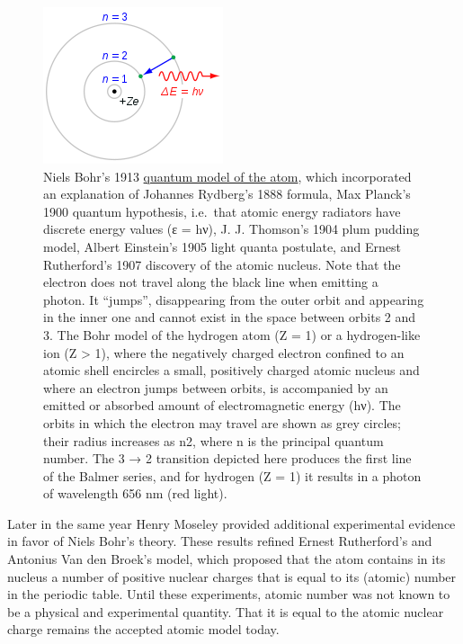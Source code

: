 \begin{figure}

{\centering \includegraphics[width=0.7\linewidth]{./figures/chemistry/Bohr_atom_model} 

}

\caption{Niels Bohr's 1913 \href{https://en.wikipedia.org/wiki/Bohr_model\#/media/File:Bohr_atom_model.svg}{quantum model of the atom}, which incorporated an explanation of Johannes Rydberg's 1888 formula, Max Planck's 1900 quantum hypothesis, i.e.~that atomic energy radiators have discrete energy values (ε = hν), J. J. Thomson's 1904 plum pudding model, Albert Einstein's 1905 light quanta postulate, and Ernest Rutherford's 1907 discovery of the atomic nucleus. Note that the electron does not travel along the black line when emitting a photon. It ``jumps'', disappearing from the outer orbit and appearing in the inner one and cannot exist in the space between orbits 2 and 3. The Bohr model of the hydrogen atom (Z = 1) or a hydrogen-like ion (Z \textgreater{} 1), where the negatively charged electron confined to an atomic shell encircles a small, positively charged atomic nucleus and where an electron jumps between orbits, is accompanied by an emitted or absorbed amount of electromagnetic energy (hν). The orbits in which the electron may travel are shown as grey circles; their radius increases as n2, where n is the principal quantum number. The 3 → 2 transition depicted here produces the first line of the Balmer series, and for hydrogen (Z = 1) it results in a photon of wavelength 656 nm (red light).}\label{fig:bohrmodel}
\end{figure}

Later in the same year Henry Moseley provided additional experimental
evidence in favor of Niels Bohr's theory. These results refined Ernest
Rutherford's and Antonius Van den Broek's model, which proposed that the
atom contains in its nucleus a number of positive nuclear charges that
is equal to its (atomic) number in the periodic table. Until these
experiments, atomic number was not known to be a physical and
experimental quantity. That it is equal to the atomic nuclear charge
remains the accepted atomic model today.

